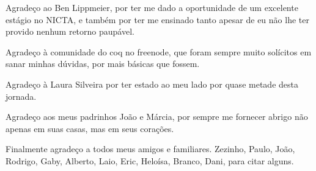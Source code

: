 \documentclass[bacharelado]{unb-cic}
\theoremstyle{definition}
\theoremstyle{definition}
\begin{document}
\begin{agradecimentos}
    Agradeço ao Ben Lippmeier, por ter me dado a oportunidade de um excelente estágio
    no NICTA, e também por ter me ensinado tanto apesar de eu não lhe ter provido nenhum retorno paupável. 

    Agradeço à comunidade do coq no freenode, que foram sempre muito solícitos em
    sanar minhas dúvidas, por mais básicas que fossem.

    Agradeço à Laura Silveira por ter estado ao meu lado por quase metade desta jornada.

    Agradeço aos meus padrinhos João e Márcia, por sempre me fornecer abrigo não apenas em suas casas, mas em seus corações.

    Finalmente agradeço a todos meus amigos e familiares. Zezinho, Paulo, 
    João, Rodrigo, Gaby, Alberto, Laio, Eric, Heloísa, Branco, Dani, para citar alguns.
  \end{agradecimentos}


  
  \tableofcontents
  \printglossary
  \listoffigures
  \listoftables

  \textual    
  
  
  
  
  
  
  


  \postextual
  
  
\end{document}
